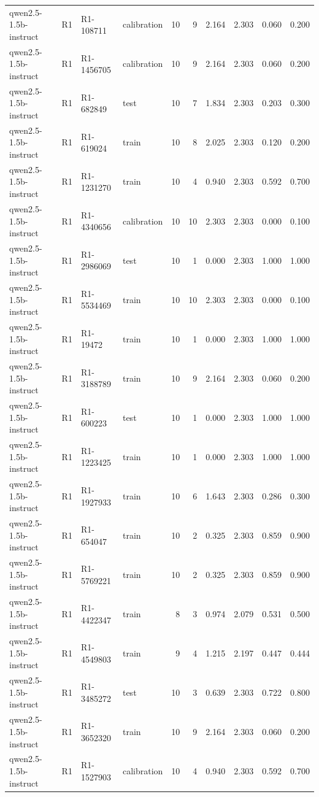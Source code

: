 \begin{table}
\begin{tabular}{llllrrrrrr}
qwen2.5-1.5b-instruct & R1 & R1-108711 & calibration & 10 & 9 & 2.164 & 2.303 & 0.060 & 0.200 \\
qwen2.5-1.5b-instruct & R1 & R1-1456705 & calibration & 10 & 9 & 2.164 & 2.303 & 0.060 & 0.200 \\
qwen2.5-1.5b-instruct & R1 & R1-682849 & test & 10 & 7 & 1.834 & 2.303 & 0.203 & 0.300 \\
qwen2.5-1.5b-instruct & R1 & R1-619024 & train & 10 & 8 & 2.025 & 2.303 & 0.120 & 0.200 \\
qwen2.5-1.5b-instruct & R1 & R1-1231270 & train & 10 & 4 & 0.940 & 2.303 & 0.592 & 0.700 \\
qwen2.5-1.5b-instruct & R1 & R1-4340656 & calibration & 10 & 10 & 2.303 & 2.303 & 0.000 & 0.100 \\
qwen2.5-1.5b-instruct & R1 & R1-2986069 & test & 10 & 1 & 0.000 & 2.303 & 1.000 & 1.000 \\
qwen2.5-1.5b-instruct & R1 & R1-5534469 & train & 10 & 10 & 2.303 & 2.303 & 0.000 & 0.100 \\
qwen2.5-1.5b-instruct & R1 & R1-19472 & train & 10 & 1 & 0.000 & 2.303 & 1.000 & 1.000 \\
qwen2.5-1.5b-instruct & R1 & R1-3188789 & train & 10 & 9 & 2.164 & 2.303 & 0.060 & 0.200 \\
qwen2.5-1.5b-instruct & R1 & R1-600223 & test & 10 & 1 & 0.000 & 2.303 & 1.000 & 1.000 \\
qwen2.5-1.5b-instruct & R1 & R1-1223425 & train & 10 & 1 & 0.000 & 2.303 & 1.000 & 1.000 \\
qwen2.5-1.5b-instruct & R1 & R1-1927933 & train & 10 & 6 & 1.643 & 2.303 & 0.286 & 0.300 \\
qwen2.5-1.5b-instruct & R1 & R1-654047 & train & 10 & 2 & 0.325 & 2.303 & 0.859 & 0.900 \\
qwen2.5-1.5b-instruct & R1 & R1-5769221 & train & 10 & 2 & 0.325 & 2.303 & 0.859 & 0.900 \\
qwen2.5-1.5b-instruct & R1 & R1-4422347 & train & 8 & 3 & 0.974 & 2.079 & 0.531 & 0.500 \\
qwen2.5-1.5b-instruct & R1 & R1-4549803 & train & 9 & 4 & 1.215 & 2.197 & 0.447 & 0.444 \\
qwen2.5-1.5b-instruct & R1 & R1-3485272 & test & 10 & 3 & 0.639 & 2.303 & 0.722 & 0.800 \\
qwen2.5-1.5b-instruct & R1 & R1-3652320 & train & 10 & 9 & 2.164 & 2.303 & 0.060 & 0.200 \\
qwen2.5-1.5b-instruct & R1 & R1-1527903 & calibration & 10 & 4 & 0.940 & 2.303 & 0.592 & 0.700 \\

\end{tabular}
\end{table}
